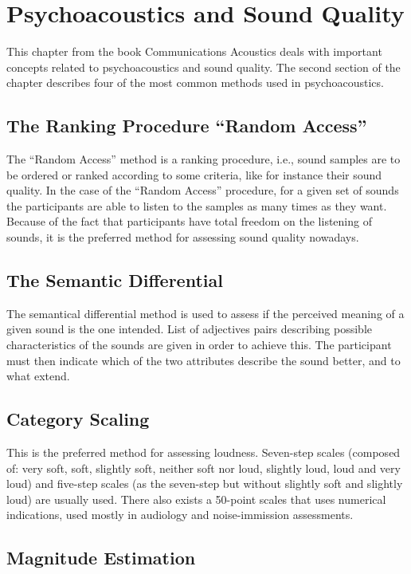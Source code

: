 \section{Psychoacoustics and Sound Quality}

This chapter from the book Communications Acoustics deals with important
concepts related to psychoacoustics and sound quality. The second section of the
chapter describes four of the most common methods used in psychoacoustics.

\subsection{The Ranking Procedure ``Random Access''}

The ``Random Access'' method is a ranking procedure, i.e., sound samples are to
be ordered or ranked according to some criteria, like for instance their sound
quality. In the case of the ``Random Access'' procedure, for a given set of
sounds the participants are able to listen to the samples as many times as they
want. Because of the fact that participants have total freedom on the listening
of sounds, it is the preferred method for assessing sound quality nowadays.

\subsection{The Semantic Differential}

The semantical differential method is used to assess if the perceived meaning of
a given sound is the one intended. List of adjectives pairs describing possible
characteristics of the sounds are given in order to achieve this. The
participant must then indicate which of the two attributes describe the sound
better, and to what extend.

\subsection{Category Scaling} 

This is the preferred method for assessing loudness. Seven-step scales (composed
of: very soft, soft, slightly soft, neither soft nor loud, slightly loud, loud
and very loud) and five-step scales (as the seven-step but without slightly soft
and slightly loud) are usually used. There also exists a 50-point scales that
uses numerical indications, used mostly in audiology and noise-immission
assessments.

\subsection{Magnitude Estimation}

